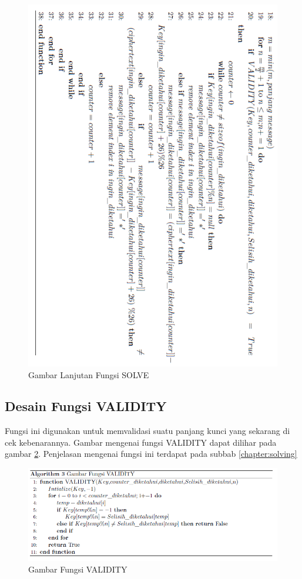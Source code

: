 	\begin{figure}[H]
		\centering
		\includegraphics[scale=0.62]{images/bab3/solvefx2.png}
		\caption{Gambar Lanjutan Fungsi SOLVE}
		\label{fig:solvefx}
	\end{figure}
	\subsection{Desain Fungsi VALIDITY}
	Fungsi ini digunakan untuk memvalidasi suatu panjang kunci yang sekarang di cek kebenarannya. Gambar mengenai fungsi VALIDITY dapat dilihar pada gambar \ref{fig:validity}. Penjelasan mengenai fungsi ini terdapat pada subbab \ref{chapter:solving}
	
 \begin{figure}[H]
		\centering
		\includegraphics[scale=0.5]{images/bab3/validity.png}
		\caption{Gambar Fungsi VALIDITY}
		\label{fig:validity}
	\end{figure}